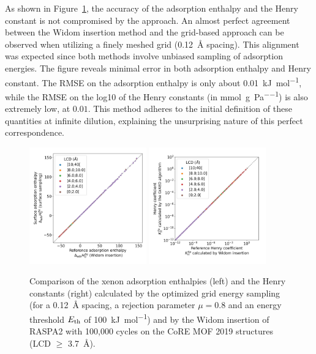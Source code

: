 \documentclass[main]{subfiles}
\begin{document}
As shown in Figure~\ref{fgr:grid_widom}, the accuracy of the adsorption enthalpy and the Henry constant is not compromised by the approach. An almost perfect agreement between the Widom insertion method and the grid-based approach can be observed when utilizing a finely meshed grid (\SI{0.12}{\angstrom} spacing). This alignment was expected since both methods involve unbiased sampling of adsorption energies. The figure reveals minimal error in both adsorption enthalpy and Henry constant. The RMSE on the adsorption enthalpy is only about \SI{0.01}{\kilo\joule\per\mole}, while the RMSE on the log10 of the Henry constants (in \si{\milli\mole\per\gram\per\pascal}) is also extremely low, at $0.01$. This method adheres to the initial definition of these quantities at infinite dilution, explaining the unsurprising nature of this perfect correspondence.

\begin{figure}[ht]
  \centering
    \includegraphics[width=0.45\textwidth]{figures/3-fastsim/H_Xe_widom_vs_H_Xe_grid_overview.jpg}
    \hfill
    \includegraphics[width=0.45\textwidth]{figures/3-fastsim/K_Xe_widom_vs_K_Xe_grid_overview.jpg}
    \caption{Comparison of the xenon adsorption enthalpies (left) and the Henry constants (right) calculated by the optimized grid energy sampling (for a \SI{0.12}{\angstrom} spacing, a rejection parameter $\mu=0.8$ and an energy threshold $E_{\text{th}}$ of \SI{100}{\kilo\joule\per\mole}) and by the Widom insertion of RASPA2 with 100,000 cycles on the CoRE MOF 2019 structures (LCD $\geq$ \SI{3.7}{\angstrom}). }\label{fgr:grid_widom}
\end{figure}
\end{document}
